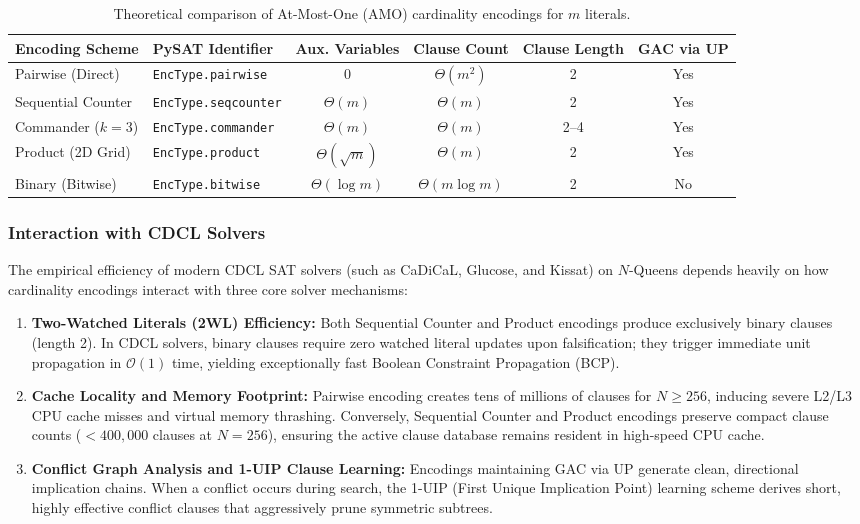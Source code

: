 \documentclass[a4paper,fleqn]{cas-sc}
\begin{document}
\begin{table}[ht]
\centering
\caption{Theoretical comparison of At-Most-One (AMO) cardinality encodings for $m$ literals.}
\label{tab:amo_theoretical_properties}
\begin{tabular}{llcccc}
\toprule
\textbf{Encoding Scheme} & \textbf{PySAT Identifier} & \textbf{Aux. Variables} & \textbf{Clause Count} & \textbf{Clause Length} & \textbf{GAC via UP} \\
\midrule
Pairwise (Direct)     & \texttt{EncType.pairwise}   & $0$                     & $\Theta(m^2)$          & 2                      & Yes                 \\
Sequential Counter    & \texttt{EncType.seqcounter} & $\Theta(m)$             & $\Theta(m)$            & 2                      & Yes                 \\
Commander ($k=3$)     & \texttt{EncType.commander}  & $\Theta(m)$             & $\Theta(m)$            & 2--4                   & Yes                 \\
Product (2D Grid)     & \texttt{EncType.product}    & $\Theta(\sqrt{m})$      & $\Theta(m)$            & 2                      & Yes                 \\
Binary (Bitwise)      & \texttt{EncType.bitwise}    & $\Theta(\log m)$        & $\Theta(m \log m)$     & 2                      & No                  \\
\bottomrule
\end{tabular}
\end{table}

\subsubsection{Interaction with CDCL Solvers}
The empirical efficiency of modern CDCL SAT solvers (such as CaDiCaL, Glucose, and Kissat) on $N$-Queens depends heavily on how cardinality encodings interact with three core solver mechanisms:
\begin{enumerate}
    \item \textbf{Two-Watched Literals (2WL) Efficiency:} Both Sequential Counter and Product encodings produce exclusively binary clauses (length 2). In CDCL solvers, binary clauses require zero watched literal updates upon falsification; they trigger immediate unit propagation in $\mathcal{O}(1)$ time, yielding exceptionally fast Boolean Constraint Propagation (BCP).
    \item \textbf{Cache Locality and Memory Footprint:} Pairwise encoding creates tens of millions of clauses for $N \ge 256$, inducing severe L2/L3 CPU cache misses and virtual memory thrashing. Conversely, Sequential Counter and Product encodings preserve compact clause counts ($<400{,}000$ clauses at $N = 256$), ensuring the active clause database remains resident in high-speed CPU cache.
    \item \textbf{Conflict Graph Analysis and 1-UIP Clause Learning:} Encodings maintaining GAC via UP generate clean, directional implication chains. When a conflict occurs during search, the 1-UIP (First Unique Implication Point) learning scheme derives short, highly effective conflict clauses that aggressively prune symmetric subtrees.
\end{enumerate}
\end{document}
